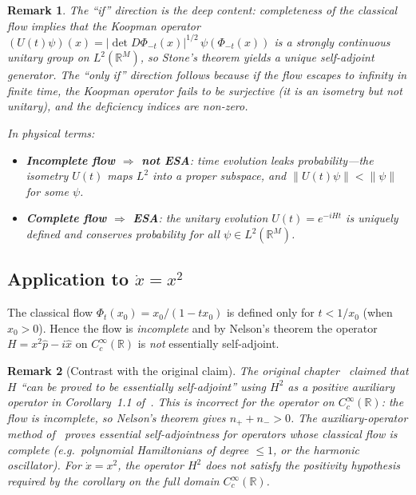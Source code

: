 \documentclass[11pt,a4paper]{article}
\newtheorem{remark}{Remark}
\newcommand{\Rset}{\mathbb{R}}
\begin{document}
\begin{remark}
The ``if'' direction is the deep content: completeness of the classical
flow implies that the Koopman operator
$(U(t)\psi)(x)=\lvert\det D\Phi_{-t}(x)\rvert^{1/2}\,
\psi(\Phi_{-t}(x))$
is a strongly continuous unitary group on $L^{2}(\Rset^{M})$, so Stone's
theorem yields a unique self-adjoint generator.  The ``only if''
direction follows because if the flow escapes to infinity in finite time,
the Koopman operator fails to be surjective (it is an isometry but not
unitary), and the deficiency indices are non-zero.

In physical terms:
\begin{itemize}
  \item \textbf{Incomplete flow $\Rightarrow$ not ESA}: time evolution
    \emph{leaks probability}---the isometry $U(t)$ maps $L^{2}$ into a
    proper subspace, and $\lVert U(t)\psi\rVert<\lVert\psi\rVert$ for
    some $\psi$.
  \item \textbf{Complete flow $\Rightarrow$ ESA}: the unitary evolution
    $U(t)=e^{-iHt}$ is uniquely defined and conserves probability for
    all $\psi\in L^{2}(\Rset^{M})$.
\end{itemize}
\end{remark}

\subsection{Application to $\dot{x}=x^{2}$}

The classical flow $\Phi_{t}(x_{0})=x_{0}/(1-tx_{0})$ is defined only
for $t<1/x_{0}$ (when $x_{0}>0$).  Hence the flow is \emph{incomplete}
and by Nelson's theorem the operator $H=x^{2}\hat{p}-i\hat{x}$ on
$C^{\infty}_{c}(\Rset)$ is \emph{not} essentially self-adjoint.

\begin{remark}[Contrast with the original claim]
The original chapter~\cite{book} claimed that $H$ ``can be proved to be
essentially self-adjoint'' using $H^{2}$ as a positive auxiliary operator
in Corollary~1.1 of~\cite{cmpux2f1103859517}.  This is \emph{incorrect}
for the operator on $C^{\infty}_{c}(\Rset)$: the flow is incomplete, so
Nelson's theorem gives $n_{+}+n_{-}>0$.  The auxiliary-operator method
of~\cite{cmpux2f1103859517,faris2006self} proves essential
self-adjointness for operators whose classical flow \emph{is} complete
(e.g.\ polynomial Hamiltonians of degree $\leq 1$, or the harmonic
oscillator).  For $\dot{x}=x^{2}$, the operator $H^{2}$ does not satisfy
the positivity hypothesis required by the corollary on the full domain
$C^{\infty}_{c}(\Rset)$.
\end{remark}
\end{document}

